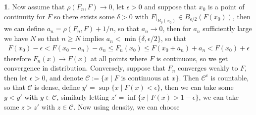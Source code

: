 \documentclass[10.5pt]{article}
\theoremstyle{definition}
\newtheorem{pb}{}
\newcommand{\set}[1]{\{#1\}}
\begin{document}
\begin{pb}
        Now assume that \(\rho(F_n,F) \to 0\), let \(\epsilon > 0\) and suppose that \(x_0\) is a point of continuity for \(F\) so there exists some \(\delta > 0\) with \(F\vert_{B_\delta(x_0)} \in B_{\epsilon/2}(F(x_0)) \), then we can define \(a_n = \rho(F_n,F) + 1/n\), so that \(a_n \to 0\), then for \(a_n\) sufficiently large we have \(N\) so that \(n \geq N\) implies \(a_n < \min\set{\delta,\epsilon/2}\), so that
        \begin{align*}
            F(x_0) - \epsilon < F(x_0 - a_n) - a_n \leq F_n(x_0) \leq F(x_0 + a_n) + a_n < F(x_0) + \epsilon
        \end{align*}
        therefore \(F_n(x) \to F(x)\) at all points where \(F\) is continuous, so we get convergence in distribution. Conversely, suppose that \(F_n\) converges weakly to \(F\), then let \(\epsilon > 0\), and denote \(\mathcal{C} := \set{x \mid F \text{ is continuous at }x}\). Then \(\mathcal{C}^c\) is countable, so that \(\mathcal{C}\) is dense, define \(y' = \sup\set{x \mid F(x) < \epsilon}\), then we can take some \(y < y'\) with \(y \in \mathcal{C}\), similarly letting \(z' = \inf\set{x \mid F(x) > 1 - \epsilon}\), we can take some \(z > z'\) with \(z \in \mathcal{C}\). Now using density, we can choose 
    \end{pb}
\end{document}

